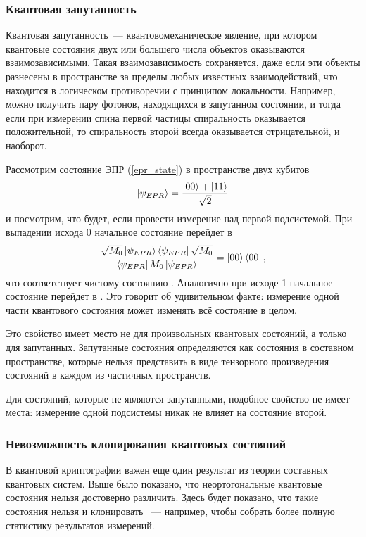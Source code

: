 \subsubsection{Квантовая запутанность}
Квантовая запутанность~--- квантовомеханическое явление, при котором квантовые состояния двух или большего числа объектов оказываются взаимозависимыми. Такая взаимозависимость сохраняется, даже если эти объекты разнесены в пространстве за пределы любых известных взаимодействий, что находится в логическом противоречии с принципом локальности. 
Например, можно получить пару фотонов, находящихся в запутанном состоянии, и тогда если при измерении спина первой частицы спиральность оказывается положительной, то спиральность второй всегда оказывается отрицательной, и наоборот.

Рассмотрим состояние ЭПР (\ref{epr_state}) в пространстве двух кубитов
\begin{equation}\left| \psi_{EPR} \right\rangle = \frac{\left| 00 \right\rangle + \left| 11 \right\rangle}{\sqrt{2}}\end{equation}
и посмотрим, что будет, если провести измерение над первой подсистемой. При выпадении исхода 0 начальное состояние перейдет в 
\begin{equation} \frac{\sqrt{M_0}\left| \psi_{EPR} \right\rangle\left\langle \psi_{EPR} \right|\sqrt{M_0}}{ \left\langle \psi_{EPR} \right|M_0\left| \psi_{EPR} \right\rangle} = \left| 00 \right\rangle\left\langle 00 \right|, \end{equation}
что соответствует чистому состоянию . Аналогично при исходе 1 начальное состояние перейдет в . Это говорит об удивительном факте: измерение одной части квантового состояния может изменять всё состояние в целом.

Это свойство имеет место не для произвольных квантовых состояний, а только для запутанных. Запутанные состояния определяются как состояния в составном пространстве, которые нельзя представить в виде тензорного произведения состояний в каждом из частичных пространств.

Для состояний, которые не являются запутанными, подобное свойство не имеет места: измерение одной подсистемы никак не влияет на состояние второй.

\subsubsection{Невозможность клонирования квантовых состояний}\label{no_cloning_theorem}
В квантовой криптографии важен еще один результат из теории составных квантовых систем. Выше было показано, что неортогональные квантовые состояния нельзя достоверно различить. Здесь будет показано, что такие состояния нельзя и клонировать \cite{no_cloning_theorem}~--- например, чтобы собрать более полную статистику результатов измерений.

